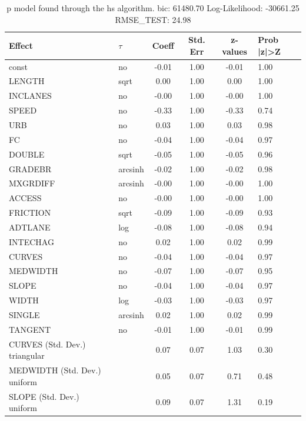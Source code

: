 \begin{table}
	\caption{p model found through the hs algorithm. bic: 61480.70 Log-Likelihood: -30661.25 RMSE_TEST: 24.98}
	\begin{center}
		\begin{tabular}{|l|l|c|c|c|l|}
			\hline
			Effect & $\tau$ & Coeff & Std. Err & z-values & Prob |z|>Z \\
			\hline
			const & no & -0.01 & 1.00 & -0.01 & 1.00 \\
			\hline
			LENGTH & sqrt & 0.00 & 1.00 & 0.00 & 1.00 \\
			\hline
			INCLANES & no & -0.00 & 1.00 & -0.00 & 1.00 \\
			\hline
			SPEED & no & -0.33 & 1.00 & -0.33 & 0.74 \\
			\hline
			URB & no & 0.03 & 1.00 & 0.03 & 0.98 \\
			\hline
			FC & no & -0.04 & 1.00 & -0.04 & 0.97 \\
			\hline
			DOUBLE & sqrt & -0.05 & 1.00 & -0.05 & 0.96 \\
			\hline
			GRADEBR & arcsinh & -0.02 & 1.00 & -0.02 & 0.98 \\
			\hline
			MXGRDIFF & arcsinh & -0.00 & 1.00 & -0.00 & 1.00 \\
			\hline
			ACCESS & no & -0.00 & 1.00 & -0.00 & 1.00 \\
			\hline
			FRICTION & sqrt & -0.09 & 1.00 & -0.09 & 0.93 \\
			\hline
			ADTLANE & log & -0.08 & 1.00 & -0.08 & 0.94 \\
			\hline
			INTECHAG & no & 0.02 & 1.00 & 0.02 & 0.99 \\
			\hline
			CURVES & no & -0.04 & 1.00 & -0.04 & 0.97 \\
			\hline
			MEDWIDTH & no & -0.07 & 1.00 & -0.07 & 0.95 \\
			\hline
			SLOPE & no & -0.04 & 1.00 & -0.04 & 0.97 \\
			\hline
			WIDTH & log & -0.03 & 1.00 & -0.03 & 0.97 \\
			\hline
			SINGLE & arcsinh & 0.02 & 1.00 & 0.02 & 0.99 \\
			\hline
			TANGENT & no & -0.01 & 1.00 & -0.01 & 0.99 \\
			\hline
			CURVES (Std. Dev.) triangular &  & 0.07 & 0.07 & 1.03 & 0.30 \\
			\hline
			MEDWIDTH (Std. Dev.) uniform &  & 0.05 & 0.07 & 0.71 & 0.48 \\
			\hline
			SLOPE (Std. Dev.) uniform &  & 0.09 & 0.07 & 1.31 & 0.19 \\

\end{tabular}
\end{center}
\end{table}
